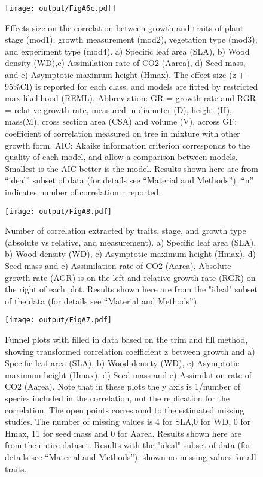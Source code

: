 \documentclass[a4paper,11pt]{article}
\begin{document}
\begin{appendices}
\begin{figure}[h!]
\centering
\texttt{[image: output/FigA6c.pdf]}
\caption{Effects size on the correlation between growth and traits of plant stage (mod1), growth measurement (mod2), vegetation type (mod3), and experiment type (mod4). a) Specific leaf area (SLA), b) Wood density (WD),c) Assimilation rate of CO2 (Aarea), d) Seed mass, and e) Asymptotic maximum height (Hmax). The effect size (z + 95\%CI) is reported for each class, and models are fitted by restricted max likelihood (REML). Abbreviation: GR = growth rate and RGR = relative growth rate, measured in diameter (D), height (H), mass(M), cross section area (CSA) and volume (V), across GF: coefficient of correlation measured on tree in mixture with other growth form. AIC: Akaike information criterion corresponds to the quality of each model, and allow a comparison between models. Smallest is the AIC better is the model. Results shown here are from ``ideal'' subset of data (for details see ``Material and Methods''). ``n'' indicates number of correlation r reported.}
\label{fig:figA6}
\end{figure}

\begin{figure}[h!]
\centering
\texttt{[image: output/FigA8.pdf]}
\caption{Number of correlation extracted by traits, stage, and growth type (absolute vs relative, and measurement). a) Specific leaf area (SLA), b) Wood density (WD), c) Asymptotic maximum height (Hmax), d) Seed mass and e) Assimilation rate of CO2 (Aarea). Absolute growth rate (AGR) is on the left and relative growth rate (RGR) on the right of each plot. Results shown here are from the "ideal" subset of the data (for details see ``Material and Methods''). }
\label{fig:figA8}
\end{figure}

\begin{figure}[h!]
\centering
\texttt{[image: output/FigA7.pdf]}
\caption{Funnel plots with filled in data based on the trim and fill method, showing transformed correlation coefficient z between growth and a) Specific leaf area (SLA), b) Wood density (WD), c) Asymptotic maximum height (Hmax), d) Seed mass and e) Assimilation rate of CO2 (Aarea). Note that in these plots the y axis is 1/number of species included in the correlation, not the replication for the correlation. The open points correspond to the estimated missing studies. The number of missing values is 4 for SLA,0 for WD, 0 for Hmax, 11 for seed mass and 0 for Aarea. Results shown here are from the entire dataset. Results with the "ideal" subset of data (for details see ``Material and Methods''), shown no missing values for all traits.}
\label{fig:figA7}
\end{figure}



\end{appendices}
\end{document}
